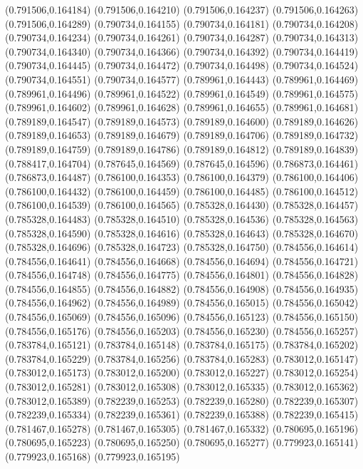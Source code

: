 (0.791506,0.164184)
(0.791506,0.164210)
(0.791506,0.164237)
(0.791506,0.164263)
(0.791506,0.164289)
(0.790734,0.164155)
(0.790734,0.164181)
(0.790734,0.164208)
(0.790734,0.164234)
(0.790734,0.164261)
(0.790734,0.164287)
(0.790734,0.164313)
(0.790734,0.164340)
(0.790734,0.164366)
(0.790734,0.164392)
(0.790734,0.164419)
(0.790734,0.164445)
(0.790734,0.164472)
(0.790734,0.164498)
(0.790734,0.164524)
(0.790734,0.164551)
(0.790734,0.164577)
(0.789961,0.164443)
(0.789961,0.164469)
(0.789961,0.164496)
(0.789961,0.164522)
(0.789961,0.164549)
(0.789961,0.164575)
(0.789961,0.164602)
(0.789961,0.164628)
(0.789961,0.164655)
(0.789961,0.164681)
(0.789189,0.164547)
(0.789189,0.164573)
(0.789189,0.164600)
(0.789189,0.164626)
(0.789189,0.164653)
(0.789189,0.164679)
(0.789189,0.164706)
(0.789189,0.164732)
(0.789189,0.164759)
(0.789189,0.164786)
(0.789189,0.164812)
(0.789189,0.164839)
(0.788417,0.164704)
(0.787645,0.164569)
(0.787645,0.164596)
(0.786873,0.164461)
(0.786873,0.164487)
(0.786100,0.164353)
(0.786100,0.164379)
(0.786100,0.164406)
(0.786100,0.164432)
(0.786100,0.164459)
(0.786100,0.164485)
(0.786100,0.164512)
(0.786100,0.164539)
(0.786100,0.164565)
(0.785328,0.164430)
(0.785328,0.164457)
(0.785328,0.164483)
(0.785328,0.164510)
(0.785328,0.164536)
(0.785328,0.164563)
(0.785328,0.164590)
(0.785328,0.164616)
(0.785328,0.164643)
(0.785328,0.164670)
(0.785328,0.164696)
(0.785328,0.164723)
(0.785328,0.164750)
(0.784556,0.164614)
(0.784556,0.164641)
(0.784556,0.164668)
(0.784556,0.164694)
(0.784556,0.164721)
(0.784556,0.164748)
(0.784556,0.164775)
(0.784556,0.164801)
(0.784556,0.164828)
(0.784556,0.164855)
(0.784556,0.164882)
(0.784556,0.164908)
(0.784556,0.164935)
(0.784556,0.164962)
(0.784556,0.164989)
(0.784556,0.165015)
(0.784556,0.165042)
(0.784556,0.165069)
(0.784556,0.165096)
(0.784556,0.165123)
(0.784556,0.165150)
(0.784556,0.165176)
(0.784556,0.165203)
(0.784556,0.165230)
(0.784556,0.165257)
(0.783784,0.165121)
(0.783784,0.165148)
(0.783784,0.165175)
(0.783784,0.165202)
(0.783784,0.165229)
(0.783784,0.165256)
(0.783784,0.165283)
(0.783012,0.165147)
(0.783012,0.165173)
(0.783012,0.165200)
(0.783012,0.165227)
(0.783012,0.165254)
(0.783012,0.165281)
(0.783012,0.165308)
(0.783012,0.165335)
(0.783012,0.165362)
(0.783012,0.165389)
(0.782239,0.165253)
(0.782239,0.165280)
(0.782239,0.165307)
(0.782239,0.165334)
(0.782239,0.165361)
(0.782239,0.165388)
(0.782239,0.165415)
(0.781467,0.165278)
(0.781467,0.165305)
(0.781467,0.165332)
(0.780695,0.165196)
(0.780695,0.165223)
(0.780695,0.165250)
(0.780695,0.165277)
(0.779923,0.165141)
(0.779923,0.165168)
(0.779923,0.165195)
